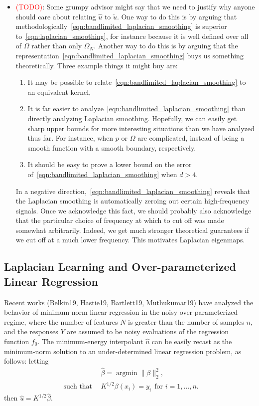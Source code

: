 \documentclass{article}
\newcommand{\1}{\mathbf{1}}
\DeclareMathOperator*{\argmin}{argmin}
\newcommand{\wh}[1]{\widehat{#1}}
\theoremstyle{definition}
\theoremstyle{remark}
\begin{document}
\begin{itemize}
	\item \textcolor{red}{(TODO)}: Some grumpy advisor might say that we need to justify why anyone should care about relating $\wh{u}$ to $\check{u}$. One way to do this is by arguing that methodologically~\eqref{eqn:bandlimited_laplacian_smoothing} is superior to~\eqref{eqn:laplacian_smoothing}, for instance because it is well defined over all of $\Omega$ rather than only $\Omega_N$. Another way to do this is by arguing that the representation~\eqref{eqn:bandlimited_laplacian_smoothing} buys us something theoretically. Three example things it might buy are: 
	\begin{enumerate}[(1)]
		\item It may be possible to relate~\eqref{eqn:bandlimited_laplacian_smoothing} to an equivalent kernel,
		\item It is far easier to analyze~\eqref{eqn:bandlimited_laplacian_smoothing} than directly analyzing Laplacian smoothing. Hopefully, we can easily get sharp upper bounds for more interesting situations than we have analyzed thus far. For instance, when $p$ or $\Omega$ are complicated, instead of being a smooth function with a smooth boundary, respectively. 
		\item It should be easy to prove a lower bound on the error of~\eqref{eqn:bandlimited_laplacian_smoothing} when $d > 4$. 
	\end{enumerate}
	In a negative direction,~\eqref{eqn:bandlimited_laplacian_smoothing} reveals that the Laplacian smoothing is automatically zeroing out certain high-frequency signals. Once we acknowledge this fact, we should probably also acknowledge that the particular choice of frequency at which to cut off was made somewhat arbitrarily. Indeed, we get much stronger theoretical guarantees if we cut off at a much lower frequency. This motivates Laplacian eigenmaps.
\end{itemize}


\subsection{Laplacian Learning and Over-parameterized Linear Regression}
Recent works (Belkin19, Hastie19, Bartlett19, Muthukumar19) have analyzed the behavior of minimum-norm linear regression in the noisy over-parameterized regime, where the number of features $N$ is greater than the number of samples $n$, and the responses $Y$ are assumed to be noisy evaluations of the regression function $f_0$. The minimum-energy interpolant $\wh{u}$ can be easily recast as the minimum-norm solution to an under-determined linear regression problem, as follows: letting
\begin{equation}
\begin{aligned}
& \wh{\beta} = \argmin \|\beta\|_2^2, \\
~~\textrm{such that} ~~& K^{1/2}\beta(x_i) = y_i~~\textrm{for~$i = 1,\ldots,n$.}
\end{aligned}
\end{equation}
then $\wh{u} = K^{1/2} \wh{\beta}$.
\end{document}
